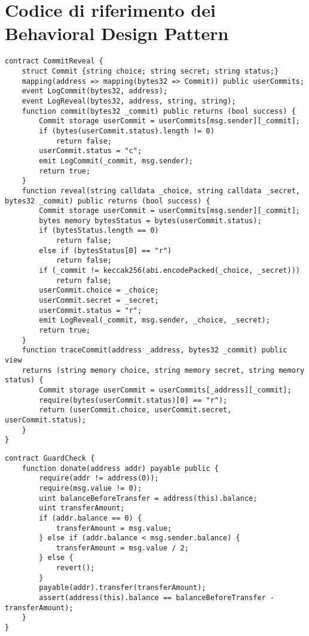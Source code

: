 {\section{Codice di riferimento dei Behavioral Design Pattern}

{\begin{lstlisting}[language=Solidity, caption={Codice di riferimento per Commit and Reveal}, label={appendix:commit_and_reveal}]
contract CommitReveal {
	struct Commit {string choice; string secret; string status;}
	mapping(address => mapping(bytes32 => Commit)) public userCommits;
	event LogCommit(bytes32, address);
	event LogReveal(bytes32, address, string, string);
	function commit(bytes32 _commit) public returns (bool success) {
		Commit storage userCommit = userCommits[msg.sender][_commit];
		if (bytes(userCommit.status).length != 0)
			return false;
		userCommit.status = "c";
		emit LogCommit(_commit, msg.sender);
		return true;
	}
	function reveal(string calldata _choice, string calldata _secret, bytes32 _commit) public returns (bool success) {
		Commit storage userCommit = userCommits[msg.sender][_commit];
		bytes memory bytesStatus = bytes(userCommit.status);
		if (bytesStatus.length == 0)
			return false;
		else if (bytesStatus[0] == "r")
			return false;
		if (_commit != keccak256(abi.encodePacked(_choice, _secret)))
			return false; 
		userCommit.choice = _choice;
		userCommit.secret = _secret;
		userCommit.status = "r";
		emit LogReveal(_commit, msg.sender, _choice, _secret);
		return true;
	}
	function traceCommit(address _address, bytes32 _commit) public view
	returns (string memory choice, string memory secret, string memory status) {
		Commit storage userCommit = userCommits[_address][_commit];
		require(bytes(userCommit.status)[0] == "r");
		return (userCommit.choice, userCommit.secret, userCommit.status);
	}
}
\end{lstlisting}}

{\begin{lstlisting}[language=Solidity, caption={Codice di riferimento per GuardCheck}, label={appendix:guardcheck}]
contract GuardCheck {
	function donate(address addr) payable public {
		require(addr != address(0));
		require(msg.value != 0);
		uint balanceBeforeTransfer = address(this).balance;
		uint transferAmount;
		if (addr.balance == 0) {
			transferAmount = msg.value;
		} else if (addr.balance < msg.sender.balance) {
			transferAmount = msg.value / 2;
		} else {
			revert();
		}
		payable(addr).transfer(transferAmount);
		assert(address(this).balance == balanceBeforeTransfer - transferAmount);      
	}
}
\end{lstlisting}}

}
